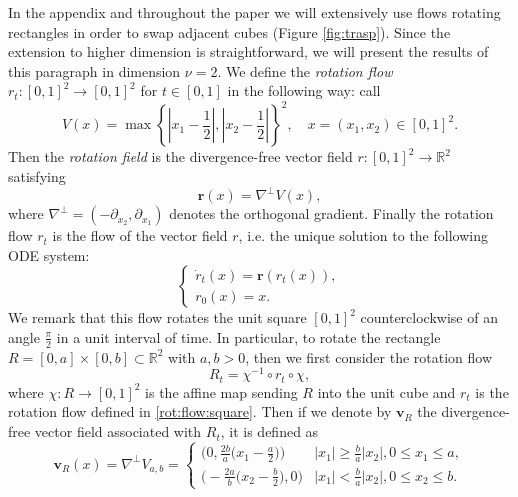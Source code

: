\documentclass[12 pt]{article}
\theoremstyle{definition} \newtheorem{definition}{Definition}[section]
\theoremstyle{definition} \newtheorem{remark}[definition]{Remark}
\theoremstyle{plain} \newtheorem{lemma}[definition]{Lemma}
\theoremstyle{plain} \newtheorem{proposition}[definition]{Proposition}
\theoremstyle{plain} \newtheorem{theorem}[definition]{Theorem}
\theoremstyle{plain} \newtheorem{corollary}[definition]{Corollary}
\theoremstyle{definition} \newtheorem{example}[definition]{Example}
\theoremstyle{definition} \newtheorem{assumption}[definition]{Assumption}
\theoremstyle{definition} \newtheorem{conjecture}[definition]{Conjecture}
\newcommand{\1}{\mathbbm 1}
\numberwithin{equation}{section}
\begin{document}
In the appendix and throughout the paper we will extensively use flows rotating rectangles in order to swap adjacent cubes (Figure \ref{fig:trasp}). Since the extension to higher dimension is straightforward, we will present the results of this paragraph in dimension $\nu=2$. We define the \emph{rotation flow} $r_{t}:[0,1]^2\rightarrow [0,1]^2$ for $t\in[0,1]$ in the following way: call
\begin{equation*}
	V(x)=\max \left\{ \left| x_1-\frac{1}{2}\right|, \left| x_2-\frac{1}{2}\right|\right\}^2, \quad x=(x_1,x_2)\in [0,1]^2.
\end{equation*}
Then the \emph{rotation field} is the divergence-free vector field $r:[0,1]^2\rightarrow \mathbb R^2$ satisfying
\begin{equation}
	\label{rotation field}
	{\mathbf r}(x)=\nabla^\perp V(x),
\end{equation}
where $\nabla^\perp =(-\partial_{x_2},\partial_{x_1})$ denotes the orthogonal gradient. Finally the rotation flow $r_{t}$ is the flow of the vector field $r$, i.e. the unique solution to the following ODE system:
\begin{equation}
\label{rot:flow:square}
	\begin{cases} 
	\dot {r}_{t}(x)={\mathbf r}(r_{t}(x)), \\
	r_{0}(x)=x.
	\end{cases}
\end{equation}
We remark that this flow rotates the unit square $[0,1]^2$ counterclockwise of an angle $\frac{\pi}{2}$ in a unit interval of time. In particular, to rotate the rectangle $R=[0,a] \times [0,b]\subset\mathbb R^2$ with $a,b>0$, then we first consider the rotation flow
\begin{equation*}
    R_{t}=\chi^{-1}\circ r_t\circ \chi,
\end{equation*}
where $\chi:R\rightarrow [0,1]^2$ is the affine map sending $R$ into the unit cube and $r_t$ is the rotation flow defined in \eqref{rot:flow:square}. Then if we denote by $\mathbf v_R$ the divergence-free vector field associated with $R_t$, it is defined as
\begin{equation}\label{eq:rot:vf:rectangle}
\mathbf v_R(x) = \nabla^\perp V_{a,b} = \begin{cases}
\big( 0, \frac{2b}{a} \big( x_1 - \frac{a}{2} \big) \big) & |x_1| \geq \frac{b}{a} |x_2|, 0 \leq x_1 \leq a, \\
\big( -\frac{2a}{b} \big( x_2 - \frac{b}{2} \big),0 \big) & |x_1| < \frac{b}{a} |x_2|, 0 \leq x_2 \leq b.
\end{cases}
\end{equation}
\end{document}
